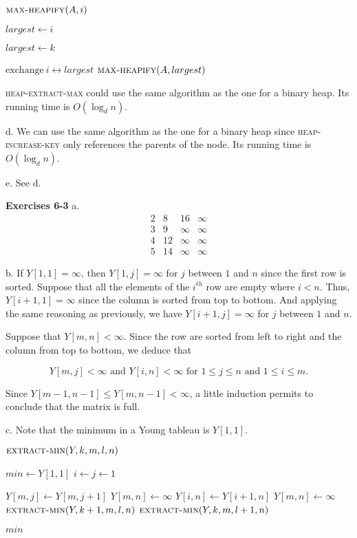\documentclass[a4paper,12pt]{article}
\newcommand{\newpar}[1]
{\bigskip \noindent \textbf{Exercises #1} \newline}
\newcommand{\subpar}[1]{\medskip \noindent #1.}
\newcommand{\la}{\leftarrow}
\newcommand{\exchange}[2]{\mathrm{exchange}\ #1 \leftrightarrow #2}
\newenvironment{alg}[2]
               {\noindent $\textsc{#1}(#2)$ \begin{algorithmic}}
               {\end{algorithmic}}
\begin{document}
\begin{alg}{max-heapify}{A, i}
  \STATE $largest \la i$

  \STATE $largest \la k$
  \ENDIF
  \ENDFOR

  \STATE $\exchange{i}{largest}$
  \STATE $\textsc{max-heapify}(A, largest)$
  \ENDIF
\end{alg}

\textsc{heap-extract-max} could use the same algorithm as the one for
a binary heap.  Its running time is $O(\log_d n)$.

\subpar{d}  We can use the same algorithm as the one for a binary heap
since \textsc{heap-increase-key} only references the parents of the
node.  Its running time is $O(\log_d n)$.

\subpar{e} See d.

\newpar{6-3}
\subpar{a}
\[
\begin{array}{cccc}
  2 & 8 & 16 & \infty \\
  3 & 9 & \infty & \infty \\
  4 & 12  & \infty & \infty \\
  5 & 14 & \infty & \infty
\end{array}
\]

\subpar{b}
If $Y[1, 1] = \infty$, then $Y[1, j] = \infty$ for $j$ between $1$ and
$n$ since the first row is sorted.  Suppose that all the elements of
the $i^{th}$ row are empty where $i < n$.  Thus, $Y[i+1, 1] = \infty$
since the column is sorted from top to bottom.  And applying the same
reasoning as previously, we have $Y[i+1, j] = \infty$ for $j$ between
$1$ and $n$.

\medskip
Suppose that $Y[m, n] < \infty$.  Since the row are sorted from left
to right and the column from top to bottom, we deduce that

\[ Y[m, j] < \infty \mbox{ and } Y[i, n] < \infty \mbox{ for $1 \le j
  \le n$ and $1 \le i \le m$}.\]

Since $Y[m-1, n-1] \le Y[m, n-1] < \infty$, a little induction permits
to conclude that the matrix is full.

\subpar{c}
Note that the minimum in a Young tableau is $Y[1, 1]$.

\begin{alg}{extract-min}{Y, k, m, l, n}
  \STATE $min \la Y[1, 1]$
  \STATE $i \la j \la 1$

  \STATE $Y[m, j] \la Y[m, j+1]$
  \ENDWHILE
  \STATE $Y[m, n] \la \infty$
  \STATE $Y[i, n] \la Y[i+1, n]$
  \ENDWHILE
  \STATE $Y[m, n] \la \infty$
  \STATE $\textsc{extract-min}(Y, k+1, m, l, n)$
  \ELSE
  \STATE $\textsc{extract-min}(Y, k, m, l+1, n)$
  \ENDIF

  \RETURN $min$
\end{alg}
\end{document}
